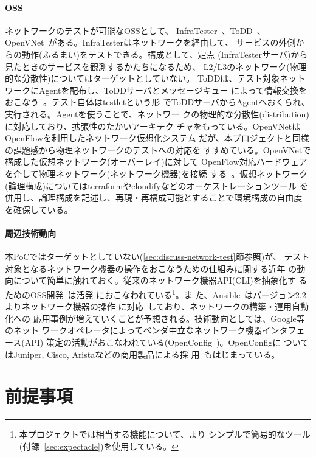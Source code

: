     \paragraph{OSS}
ネットワークのテストが可能なOSSとして、
InfraTester~\cite{infratester-github}、ToDD~\cite{todd-github}、
OpenVNet~\cite{openvnet-web}がある。InfraTesterはネットワークを経由して、
サービスの外側からの動作(ふるまい)をテストできる。構成として、定点
(InfraTesterサーバ)から見たときのサービスを観測するかたちになるため、
L2/L3のネットワーク(物理的な分散性)についてはターゲットとしていない。
ToDDは、テスト対象ネットワークにAgentを配布し、ToDDサーバとメッセージキュー
によって情報交換をおこなう~\cite{todd-blog}。テスト自体はtestletという形
でToDDサーバからAgentへおくられ、実行される。Agentを使うことで、ネットワー
クの物理的な分散性(distribution)に対応しており、拡張性のたかいアーキテク
チャをもっている。OpenVNetはOpenFlowを利用したネットワーク仮想化システム
だが、本プロジェクトと同様の課題感から物理ネットワークのテストへの対応を
すすめている。OpenVNetで構成した仮想ネットワーク(オーバーレイ)に対して
OpenFlow対応ハードウェアを介して物理ネットワーク(ネットワーク機器)を接続
する~\cite{openvnet-slide,network-testing-sdn-atmarkit}。仮想ネットワーク
(論理構成)についてはterraformやcloudifyなどのオーケストレーションツール
を併用し、論理構成を記述し、再現・再構成可能とすることで環境構成の自由度
を確保している。

    \paragraph{周辺技術動向}
本PoCではターゲットとしていない(\ref{sec:discuss-network-test}節参照)が、
テスト対象となるネットワーク機器の操作をおこなうための仕組みに関する近年
の動向について簡単に触れておく。従来のネットワーク機器API(CLI)を抽象化す
るためのOSS開発~\cite{netmiko-github,trigger-github,napalm-github}は活発
におこなわれている\footnote{本プロジェクトでは相当する機能について、より
シンプルで簡易的なツール(付録~\ref{sec:expectacle})を使用している。}。ま
た、Ansible~\cite{ansible-web}はバージョン2.2よりネットワーク機器の操作
に対応~\cite{ansible-22-news}しており、ネットワークの構築・運用自動化への
応用事例が増えていくことが予想される。技術動向としては、Google等のネット
ワークオペレータによってベンダ中立なネットワーク機器インタフェース(API)
策定の活動がおこなわれている(OpenConfig~\cite{openconfig})。OpenConfigに
ついてはJuniper, Cisco, Aristaなどの商用製品による採
用~\cite{openconfig-news}もはじまっている。

 \section{前提事項}
 \label{sec:premise}

